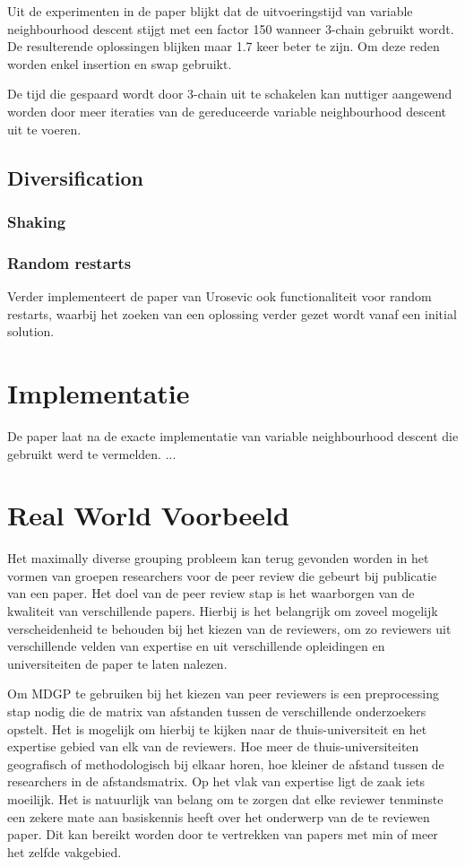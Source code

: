 \documentclass[pdftex,12pt,a4paper]{article}
\begin{document}
Uit de experimenten in de paper blijkt dat de uitvoeringstijd van variable neighbourhood descent stijgt met een factor 150 wanneer 3-chain gebruikt wordt. 
De resulterende oplossingen blijken maar 1.7 keer beter te zijn.
Om deze reden worden enkel insertion en swap gebruikt. 

De tijd die gespaard wordt door 3-chain uit te schakelen kan nuttiger aangewend worden door meer iteraties van de gereduceerde variable neighbourhood descent uit te voeren.



\subsection{Diversification}
\subsubsection{Shaking}

\subsubsection{Random restarts}
Verder implementeert de paper van Urosevic\cite{Urosevic} ook functionaliteit voor random restarts, waarbij het zoeken van een oplossing verder gezet wordt vanaf een initial solution.

\section{Implementatie}
De paper laat na de exacte implementatie van variable neighbourhood descent die gebruikt werd te vermelden. ...

\section{Real World Voorbeeld}

Het maximally diverse grouping probleem kan terug gevonden worden in het vormen van groepen researchers voor de peer review die gebeurt bij publicatie van een paper. Het doel van de peer review stap is het waarborgen van de kwaliteit van verschillende papers. Hierbij is het belangrijk om zoveel mogelijk verscheidenheid te behouden bij het kiezen van de reviewers, om zo reviewers uit verschillende velden van expertise en uit verschillende opleidingen en universiteiten de paper te laten nalezen.

Om MDGP te gebruiken bij het kiezen van peer reviewers is een preprocessing stap nodig die de matrix van afstanden tussen de verschillende onderzoekers opstelt. Het is mogelijk om hierbij te kijken naar de thuis-universiteit en het expertise gebied van elk van de reviewers. Hoe meer de thuis-universiteiten geografisch of methodologisch bij elkaar horen, hoe kleiner de afstand tussen de researchers in de afstandsmatrix. Op het vlak van expertise ligt de zaak iets moeilijk. Het is natuurlijk van belang om te zorgen dat elke reviewer tenminste een zekere mate aan basiskennis heeft over het onderwerp van de te reviewen paper. Dit kan bereikt worden door te vertrekken van papers met min of meer het zelfde vakgebied.
\end{document}
